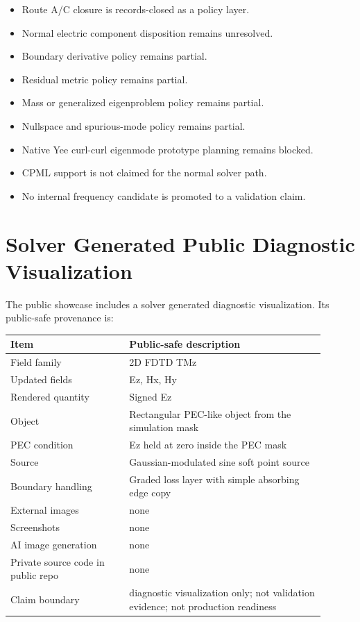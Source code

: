 \documentclass[11pt,a4paper]{article}
\begin{document}
\begin{itemize}
  \item Route A/C closure is records-closed as a policy layer.
  \item Normal electric component disposition remains unresolved.
  \item Boundary derivative policy remains partial.
  \item Residual metric policy remains partial.
  \item Mass or generalized eigenproblem policy remains partial.
  \item Nullspace and spurious-mode policy remains partial.
  \item Native Yee curl-curl eigenmode prototype planning remains blocked.
  \item CPML support is not claimed for the normal solver path.
  \item No internal frequency candidate is promoted to a validation claim.
\end{itemize}

\section{Solver Generated Public Diagnostic Visualization}
\label{sec:solver-generated-public-diagnostic-visualization}

The public showcase includes a solver generated diagnostic visualization. Its public-safe provenance is:

\begin{longtable}{p{0.34\linewidth}p{0.56\linewidth}}
\toprule
\textbf{Item} & \textbf{Public-safe description}\\
\midrule
\endhead
Field family & 2D FDTD TMz\\
Updated fields & Ez, Hx, Hy\\
Rendered quantity & Signed Ez\\
Object & Rectangular PEC-like object from the simulation mask\\
PEC condition & Ez held at zero inside the PEC mask\\
Source & Gaussian-modulated sine soft point source\\
Boundary handling & Graded loss layer with simple absorbing edge copy\\
External images & none\\
Screenshots & none\\
AI image generation & none\\
Private source code in public repo & none\\
Claim boundary & diagnostic visualization only; not validation evidence; not production readiness\\
\bottomrule
\end{longtable}
\end{document}
